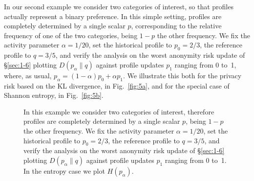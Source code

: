 In our second example we consider two categories of interest, so that profiles actually represent a binary preference. In this simple setting, profiles are completely determined by a single scalar $p$, corresponding to the relative frequency of one of the two categories, being $1-p$ the other frequency. We fix the activity parameter $\alpha = 1/20$, set the historical profile to $p_0=2/3$, the reference profile to $q=3/5$, and verify the analysis on the worst anonymity risk update of \S\ref{sec:1-6} plotting $D(p_\alpha\|q)$ against profile updates $p_1$ ranging from 0 to~1, where, as usual, $p_\alpha=(1-\alpha)p_0+\alpha p_1$. We illustrate this both for the privacy risk based on the KL divergence, in Fig.~\ref{fig:5a}, and for the special case of Shannon entropy, in Fig.~\ref{fig:5b}. 
\begin{figure}[htbp]
	\centering
	\hfil
	\caption{In this example we consider two categories of interest, therefore profiles are completely determined by a single scalar $p$, being $1-p$ the other frequency. We fix the activity parameter $\alpha = 1/20$, set the historical profile to $p_0=2/3$, the reference profile to $q=3/5$, and verify the analysis on the worst anonymity risk update of \S\ref{sec:1-6} plotting $D(p_\alpha\|q)$ against profile updates $p_1$ ranging from 0 to~1. In the entropy case we plot $H(p_\alpha)$.}
	\label{fig:5}
\end{figure}

